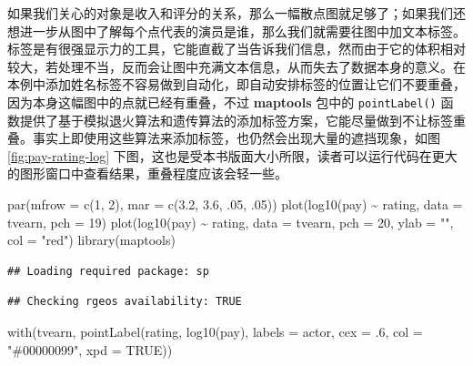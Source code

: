 \documentclass[
  b5paper,
  UTF8,twoside]{book}
\newenvironment{Shaded}{\begin{snugshade}}{\end{snugshade}}
\newcommand{\AttributeTok}[1]{\textcolor[rgb]{0.77,0.63,0.00}{#1}}
\newcommand{\ConstantTok}[1]{\textcolor[rgb]{0.00,0.00,0.00}{#1}}
\newcommand{\DecValTok}[1]{\textcolor[rgb]{0.00,0.00,0.81}{#1}}
\newcommand{\FloatTok}[1]{\textcolor[rgb]{0.00,0.00,0.81}{#1}}
\newcommand{\FunctionTok}[1]{\textcolor[rgb]{0.00,0.00,0.00}{#1}}
\newcommand{\NormalTok}[1]{#1}
\newcommand{\SpecialCharTok}[1]{\textcolor[rgb]{0.00,0.00,0.00}{#1}}
\newcommand{\StringTok}[1]{\textcolor[rgb]{0.31,0.60,0.02}{#1}}
\begin{document}
如果我们关心的对象是收入和评分的关系，那么一幅散点图就足够了；如果我们还想进一步从图中了解每个点代表的演员是谁，那么我们就需要往图中加文本标签。标签是有很强显示力的工具，它能直截了当告诉我们信息，然而由于它的体积相对较大，若处理不当，反而会让图中充满文本信息，从而失去了数据本身的意义。在本例中添加姓名标签不容易做到自动化，即自动安排标签的位置让它们不要重叠，因为本身这幅图中的点就已经有重叠，不过 \textbf{maptools} 包中的 \texttt{pointLabel()} 函数提供了基于模拟退火算法和遗传算法的添加标签方案，它能尽量做到不让标签重叠。事实上即使用这些算法来添加标签，也仍然会出现大量的遮挡现象，如图 \ref{fig:pay-rating-log} 下图，这也是受本书版面大小所限，读者可以运行代码在更大的图形窗口中查看结果，重叠程度应该会轻一些。

\begin{Shaded}
\begin{Highlighting}[]
\FunctionTok{par}\NormalTok{(}\AttributeTok{mfrow =} \FunctionTok{c}\NormalTok{(}\DecValTok{1}\NormalTok{, }\DecValTok{2}\NormalTok{), }\AttributeTok{mar =} \FunctionTok{c}\NormalTok{(}\FloatTok{3.2}\NormalTok{, }\FloatTok{3.6}\NormalTok{, .}\DecValTok{05}\NormalTok{, .}\DecValTok{05}\NormalTok{))}
\FunctionTok{plot}\NormalTok{(}\FunctionTok{log10}\NormalTok{(pay) }\SpecialCharTok{\textasciitilde{}}\NormalTok{ rating, }\AttributeTok{data =}\NormalTok{ tvearn, }\AttributeTok{pch =} \DecValTok{19}\NormalTok{)}
\FunctionTok{plot}\NormalTok{(}\FunctionTok{log10}\NormalTok{(pay) }\SpecialCharTok{\textasciitilde{}}\NormalTok{ rating, }\AttributeTok{data =}\NormalTok{ tvearn, }\AttributeTok{pch =} \DecValTok{20}\NormalTok{, }\AttributeTok{ylab =} \StringTok{""}\NormalTok{, }\AttributeTok{col =} \StringTok{"red"}\NormalTok{)}
\FunctionTok{library}\NormalTok{(maptools)}
\end{Highlighting}
\end{Shaded}

\begin{verbatim}
## Loading required package: sp
\end{verbatim}

\begin{verbatim}
## Checking rgeos availability: TRUE
\end{verbatim}

\begin{Shaded}
\begin{Highlighting}[]
\FunctionTok{with}\NormalTok{(tvearn, }\FunctionTok{pointLabel}\NormalTok{(rating, }\FunctionTok{log10}\NormalTok{(pay), }\AttributeTok{labels =}\NormalTok{ actor, }
                        \AttributeTok{cex =}\NormalTok{ .}\DecValTok{6}\NormalTok{, }\AttributeTok{col =} \StringTok{"\#00000099"}\NormalTok{, }\AttributeTok{xpd =} \ConstantTok{TRUE}\NormalTok{))}
\end{Highlighting}
\end{Shaded}
\end{document}
